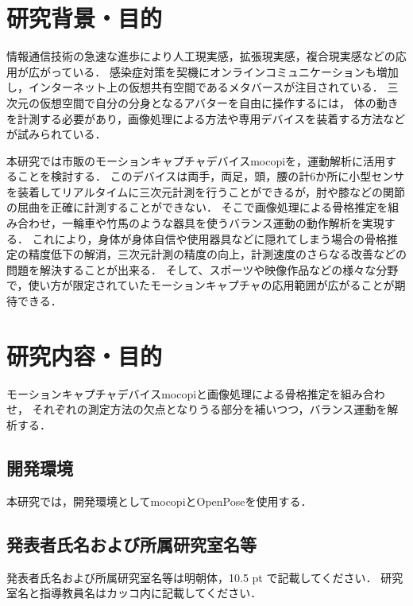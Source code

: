 \documentclass[titlepage]{jarticle}
\begin{document}
\maketitle

%
%
\section{研究背景・目的}
%
情報通信技術の急速な進歩により人工現実感，拡張現実感，複合現実感などの応用が広がっている．
感染症対策を契機にオンラインコミュニケーションも増加し，インターネット上の仮想共有空間であるメタバースが注目されている．
三次元の仮想空間で自分の分身となるアバターを自由に操作するには，
体の動きを計測する必要があり，画像処理による方法や専用デバイスを装着する方法などが試みられている． 

本研究では市販のモーションキャプチャデバイスmocopiを，運動解析に活用することを検討する．
このデバイスは両手，両足，頭，腰の計6か所に小型センサを装着してリアルタイムに三次元計測を行うことができるが，肘や膝などの関節の屈曲を正確に計測することができない．
そこで画像処理による骨格推定を組み合わせ，一輪車や竹馬のような器具を使うバランス運動の動作解析を実現する．
これにより，身体が身体自信や使用器具などに隠れてしまう場合の骨格推定の精度低下の解消，三次元計測の精度の向上，計測速度のさらなる改善などの問題を解決することが出来る．
そして、スポーツや映像作品などの様々な分野で，使い方が限定されていたモーションキャプチャの応用範囲が広がることが期待できる．
%
%
\section{研究内容・目的}
%
モーションキャプチャデバイスmocopiと画像処理による骨格推定を組み合わせ，
それぞれの測定方法の欠点となりうる部分を補いつつ，バランス運動を解析する．
%
%
\subsection{開発環境}
%
本研究では，開発環境としてmocopiとOpenPoseを使用する．
%
%
\subsection{発表者氏名および所属研究室名等}
%
発表者氏名および所属研究室名等は明朝体，10.5 pt で記載してください．
研究室名と指導教員名はカッコ内に記載してください．
%
%
\end{document}
